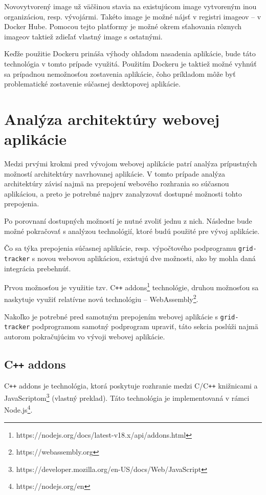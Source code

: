 Novovytvorený image už väčšinou stavia na existujúcom image vytvoreným inou organizáciou, resp. vývojármi. Takéto image je možné nájsť v registri imageov -- v Docker Hube. Pomocou tejto platformy je možné okrem sťahovania rôznych imageov taktiež zdieľať vlastný image s ostatnými.

Keďže použitie Dockeru prináša výhody ohľadom nasadenia aplikácie, bude táto technológia v tomto prípade využitá. Použitím Dockeru je taktiež možné vyhnúť sa prípadnou nemožnosťou zostavenia aplikácie, čoho príkladom môže byť problematické zostavenie súčasnej desktopovej aplikácie.

\section {Analýza architektúry webovej aplikácie}
Medzi prvými krokmi pred vývojom webovej aplikácie patrí analýza prípustných možností architektúry navrhovanej aplikácie. V tomto prípade analýza architektúry závisí najmä na prepojení webového rozhrania so súčasnou aplikáciou, a preto je potrebné najprv zanalyzovať dostupné možnosti tohto prepojenia.

Po porovnaní dostupných možností je nutné zvoliť jednu z nich. Následne bude možné pokračovať s analýzou technológií, ktoré budú použité pre vývoj aplikácie.

Čo sa týka prepojenia súčasnej aplikácie, resp. výpočtového podprogramu \texttt{grid-tracker} s novou webovou aplikáciou, existujú dve možnosti, ako by mohla daná integrácia prebehnúť.

\clearpage

Prvou možnosťou je využitie tzv. C\texttt{++} addons\footnote{https://nodejs.org/docs/latest-v18.x/api/addons.html} technológie, druhou možnosťou sa naskytuje využiť relatívne novú technológiu -- WebAssembly\footnote{https://webassembly.org}.

Nakoľko je potrebné pred samotným prepojením webovej aplikácie s \texttt{grid-tracker} podprogramom samotný podprogram upraviť, táto sekcia poslúži najmä autorom pokračujúcim vo vývoji webovej aplikácie. 

\subsection {C\texttt{++} addons}
C\texttt{++} addons je technológia, ktorá poskytuje rozhranie medzi C/C\texttt{++} knižnicami a JavaScriptom\footnote{https://developer.mozilla.org/en-US/docs/Web/JavaScript} \cite{cpp_addons} (vlastný preklad). Táto technológia je implementovaná v rámci Node.js\footnote{https://nodejs.org/en}.

